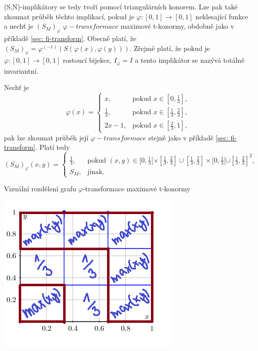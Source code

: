 (S,N)-implikátory se tedy tvoří pomocí triangulárních konorem. Lze pak také zkoumat pr\r uběh těchto implikací, pokud je $\varphi : [0,1] \rightarrow [0,1]$ neklesající funkce a nech\v t je $(S_M)_\varphi $ $ \varphi-transformace$ maximové t-konormy, obdobně jako v příkladě \ref{sec: fi-transform}. Obecně platí, že $(S_M)_\varphi = \varphi^{(-1)} (S(\varphi(x), \varphi(y))).$ Zřejmě platí, že pokud je $\varphi : [0,1] \rightarrow [0,1]$ rostoucí bijekce, $I_\varphi = I$ a tento implikátor se nazývá totálně invariantní.
\begin{example}
\label{ex: fi-transform conorm}
    Nech\v t je
    $$\varphi(x) = \begin{cases} x, & \mbox {pokud } x \in [0,\frac{1}{3}],
    \\ \frac{1}{3}, & \mbox {pokud } x \in [\frac{1}{3}, \frac{2}{3}],\\
    2x - 1, & \mbox {pokud } x \in [\frac{2}{3}, 1],
    \end{cases}$$
    pak lze zkoumat pr\r uběh její $\varphi-transformace$ stejně jako v příkladě \ref{sec: fi-transform}.
    Platí tedy $$(S_M)_\varphi(x,y) = \begin{cases} \frac{1}{3}, & \mbox {pokud } (x,y) \in [0,\frac{1}{3}[\times[\frac{1}{3},\frac{2}{3}] \cup [\frac{1}{3},\frac{2}{3}]\times[0,\frac{1}{3}[ \cup [\frac{1}{3},\frac{2}{3}]^2,
    \\ S_M, & \mbox {jinak. }
    \end{cases}$$
    \begin{graph}Vizu\' aln\' i rozd\v elen\'i grafu $\varphi$-transformace maximové t-konormy\\
    \label{graph: max-conorm}

\centering
\includegraphics[scale=0.8]{template-fig/phi-t-conorm.png}
\end{graph}
\end{example}
    


